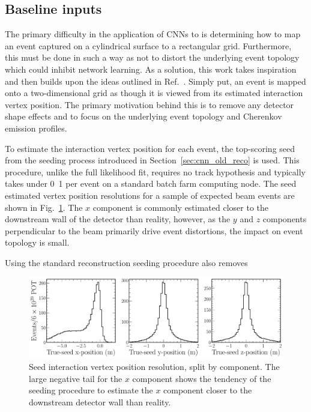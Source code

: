 \subsection{Baseline inputs} %
\label{sec:cnn_baseline_inputs} %

The primary difficulty in the application of CNNs to \chips is determining how to map an event
captured on a cylindrical surface to a rectangular grid. Furthermore, this must be done in such a
way as not to distort the underlying event topology which could inhibit network learning. As a
solution, this work takes inspiration and then builds upon the ideas outlined in
Ref.~\cite{theodore2016}. Simply put, an event is mapped onto a two-dimensional grid as though it
is viewed from its estimated interaction vertex position. The primary motivation behind this is to
remove any detector shape effects and to focus on the underlying event topology and Cherenkov
emission profiles.

To estimate the interaction vertex position for each event, the top-scoring seed from the seeding
process introduced in Section~\ref{sec:cnn_old_reco} is used. This procedure, unlike the full
likelihood fit, requires no track hypothesis and typically takes under
\unit{0.1}{} per event on a standard batch farm computing node. The seed estimated
vertex position resolutions for a sample of expected beam events are shown in
Fig.~\ref{fig:explore_true_reco_vtx}. The $x$ component is commonly estimated closer to the
downstream wall of the detector than reality, however, as the $y$ and $z$ components perpendicular
to the beam primarily drive event distortions, the impact on event topology is small.

Using the standard reconstruction seeding procedure also removes

\begin{figure} %
    \includegraphics[width=\textwidth]{diagrams/7-results/explore_true_reco_vtx.pdf}
    \caption[Seed interaction vertex resolutions]
    {Seed interaction vertex position resolution, split by component. The large negative tail for
        the $x$ component shows the tendency of the seeding procedure to estimate the $x$
        component closer to the downstream detector wall than reality.}
    \label{fig:explore_true_reco_vtx}
\end{figure}

